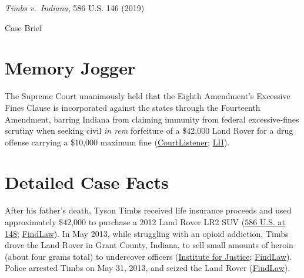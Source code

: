 \documentclass[12pt]{article}
\begin{document}
\begin{center}
{\LARGE \textit{Timbs v.\ Indiana}, 586 U.S. 146 (2019)\par}
\vspace{0.8em}
{\large Case Brief\par}
\end{center}
\vspace{1em}

\section{Memory Jogger}

The Supreme Court unanimously held that the Eighth Amendment's Excessive Fines Clause is incorporated against the states through the Fourteenth Amendment, barring Indiana from claiming immunity from federal excessive-fines scrutiny when seeking civil \textit{in rem} forfeiture of a \$42,000 Land Rover for a drug offense carrying a \$10,000 maximum fine (\href{https://www.courtlistener.com/opinion/4591916/timbs-v-indiana/}{CourtListener}; \href{https://www.law.cornell.edu/supremecourt/text/17-1091}{LII}).

\section{Detailed Case Facts}

After his father's death, Tyson Timbs received life insurance proceeds and used approximately \$42,000 to purchase a 2012 Land Rover LR2 SUV (\href{https://www.law.cornell.edu/supremecourt/text/17-1091}{586 U.S. at 148}; \href{https://caselaw.findlaw.com/court/in-supreme-court/2028477.html}{FindLaw}). In May 2013, while struggling with an opioid addiction, Timbs drove the Land Rover in Grant County, Indiana, to sell small amounts of heroin (about four grams total) to undercover officers (\href{https://ij.org/press-release/14-months-after-u-s-supreme-court-victory-tyson-timbs-wins-civil-forfeiture-case/}{Institute for Justice}; \href{https://caselaw.findlaw.com/court/in-supreme-court/2028477.html}{FindLaw}). Police arrested Timbs on May 31, 2013, and seized the Land Rover (\href{https://caselaw.findlaw.com/court/in-supreme-court/2028477.html}{FindLaw}).
\end{document}
